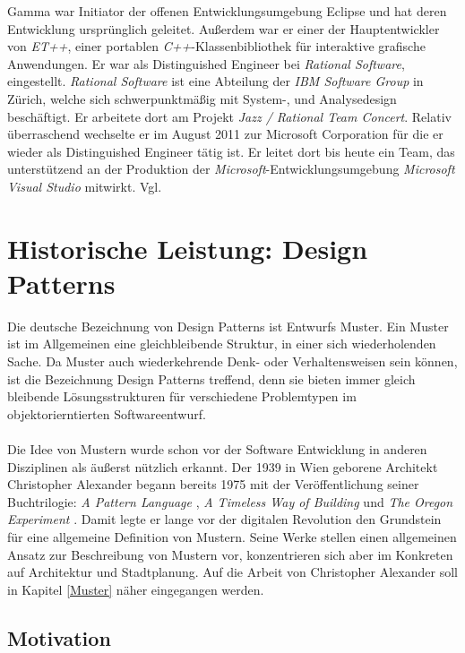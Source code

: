 \documentclass[fontsize=11pt,a4paper,final]{scrreprt}[2003/01/01]
\begin{document}
Gamma war Initiator der offenen Entwicklungsumgebung Eclipse und hat deren Entwicklung ursprünglich geleitet. Außerdem war er einer der Hauptentwickler von \textit{ET++}, einer portablen \textit{C++}-Klassenbibliothek für interaktive grafische Anwendungen. Er war als Distinguished Engineer bei \textit{Rational Software}, eingestellt. \textit{Rational Software} ist eine Abteilung der \textit{IBM Software Group} in Zürich, welche sich schwerpunktmäßig mit System-, und Analysedesign beschäftigt. Er arbeitete dort am Projekt \textit{Jazz / Rational Team Concert}. Relativ überraschend wechselte er im August 2011 zur Microsoft Corporation für die er wieder als Distinguished Engineer tätig ist. Er leitet dort bis heute ein Team, das unterstützend an der Produktion der\textit{ Microsoft}-Entwicklungsumgebung \textit{Microsoft Visual Studio} mitwirkt. Vgl. \cite{ErichGammaWikiDe}

\chapter{Historische Leistung: Design Patterns}\label{se:Historische Leistung: Design Patterns}
Die deutsche Bezeichnung von Design Patterns ist Entwurfs Muster. Ein Muster ist im Allgemeinen eine gleichbleibende Struktur, in einer sich wiederholenden Sache. Da Muster auch wiederkehrende Denk- oder Verhaltensweisen sein können, ist die Bezeichnung Design Patterns treffend, denn sie bieten immer gleich bleibende Lösungsstrukturen für verschiedene Problemtypen im objektorierntierten Softwareentwurf.
\\ \\
Die Idee von Mustern wurde schon vor der Software Entwicklung in anderen Disziplinen als äußerst nützlich erkannt. Der 1939 in Wien geborene Architekt \mbox{Christopher} \mbox{Alexander} begann bereits 1975 mit der Veröffentlichung seiner Buchtrilogie: \textit{A Pattern Language} \cite{Alexander1979}, \textit{A Timeless Way of Building} \cite{Alexander1977} und \textit{The Oregon Experiment} \cite{Alexander1975}. Damit legte er lange vor der digitalen Revolution den Grundstein für eine allgemeine Definition von Mustern. Seine Werke stellen einen allgemeinen Ansatz zur Beschreibung von Mustern vor, konzentrieren sich aber im Konkreten auf Architektur und Stadtplanung. Auf die Arbeit von Christopher Alexander soll in Kapitel \ref{Muster} näher eingegangen werden.

\section{Motivation}\label{se:Motivation}
\end{document}

